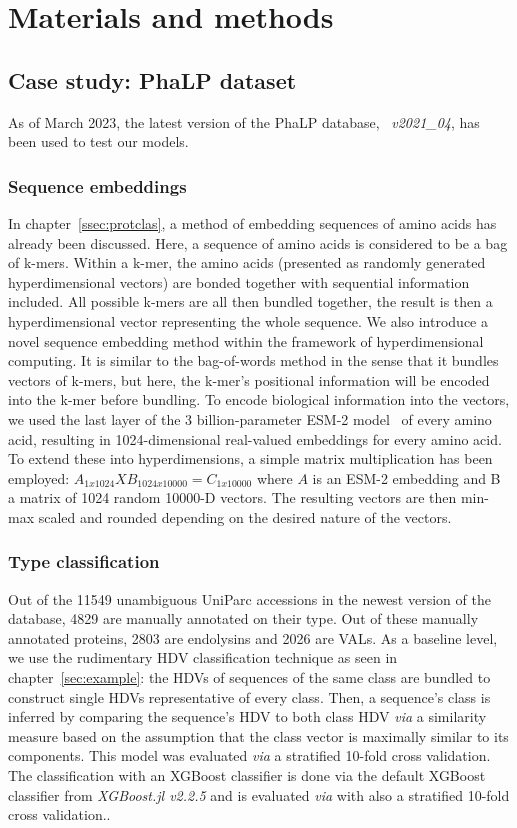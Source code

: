 \chapter[Materials and methods]{Materials and methods}
\section{Case study: PhaLP dataset}
As of March 2023, the latest version of the PhaLP database, ~\textit{v2021\_04}, has been used to test our models.

\subsection*{Sequence embeddings}
In chapter~\ref{ssec:protclas}, a method of embedding sequences of amino acids has already been discussed. Here, a sequence of amino acids is considered to be a bag of k-mers. Within a k-mer, the amino acids (presented as randomly generated hyperdimensional vectors) are bonded together with sequential information included. All possible k-mers are all then bundled together, the result is then a hyperdimensional vector representing the whole sequence. We also introduce a novel sequence embedding method within the framework of hyperdimensional computing. It is similar to the bag-of-words method in the sense that it bundles vectors of k-mers, but here, the k-mer's positional information will be encoded into the k-mer before bundling. 
To encode biological information into the vectors, we used the last layer of the 3 billion-parameter ESM-2 model~\cite{esm2} of every amino acid, resulting in 1024-dimensional real-valued embeddings for every amino acid. To extend these into hyperdimensions, a simple matrix multiplication has been employed: $A_{1x1024}X B_{1024x10000} = C_{1x10000}$ where $A$ is an ESM-2 embedding and B a matrix of 1024 random 10000-D vectors. The resulting vectors are then min-max scaled and rounded depending on the desired nature of the vectors.
\subsection*{Type classification}
Out of the 11549 unambiguous UniParc accessions in the newest version of the database, 4829 are manually annotated on their type. Out of these manually annotated proteins, 2803 are endolysins and 2026 are VALs. As a baseline level, we use the rudimentary HDV classification technique as seen in chapter~\ref{sec:example}: the HDVs of sequences of the same class are bundled to construct single HDVs representative of every class. Then, a sequence's class is inferred by comparing the sequence's HDV to both class HDV \textit{via} a similarity measure based on the assumption that the class vector is maximally similar to its components. This model was evaluated \textit{via} a stratified 10-fold cross validation. The classification with an XGBoost classifier is done via the default XGBoost classifier from \textit{XGBoost.jl v2.2.5} and is evaluated \textit{via}  with also a stratified 10-fold cross validation..